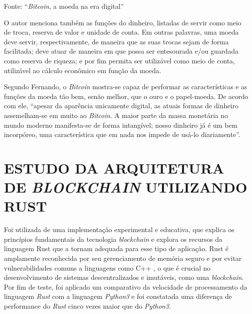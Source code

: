 \documentclass[article,12pt,oneside,a4paper,english,brazil]{unifil}
\begin{document}
\begin{Spacing}{1.5}
\begin{table}[h]
\begin{tabular}{|c|c|c|c|}
	\end{tabular}
    \label{tab:atributos}
\end{table}
\centerline{Fonte: ``\textit{Bitcoin}, a moeda na era digital''\cite{Ulrich2014}}
\FloatBarrier

O autor menciona também as funções do dinheiro, listadas de servir como meio de troca, reserva de valor e unidade de conta. Em outras palavras, uma moeda deve servir, respectivamente, de maneira que as suas trocas sejam de forma facilitada; deve atuar de maneira em que possa ser entesourada e/ou guardada como reserva de riqueza; e por fim permita ser utilizável como meio de conta, utilizável ao cálculo econômico em função da moeda.

Segundo Fernando, o \textit{Bitcoin} mostra-se capaz de performar as características e as funções da moeda tão bem, senão melhor, que o ouro e o papel-moeda. De acordo com ele, ``apesar da aparência unicamente digital, as atuais formas de dinheiro assemelham-se em muito ao \textit{Bitcoin}. A maior parte da massa monetária no mundo moderno manifesta-se de forma intangível; nosso dinheiro já é um bem incorpóreo, uma característica que em nada nos impede de usá-lo diariamente''\cite[p.95]{Ulrich2014}.



% 

\section*{ESTUDO DA ARQUITETURA DE \textit{BLOCKCHAIN} UTILIZANDO RUST}

Foi utilizada de uma implementação experimental e educativa, que explica os princípios fundamentais da tecnologia \textit{blockchain} e explora os recursos da linguagem Rust que a tornam adequada para esse tipo de aplicação. Rust é amplamente reconhecida por seu gerenciamento de memória seguro e por evitar vulnerabilidades comuns a linguagens como C++ \cite{matsakis2014rust}, o que é crucial no desenvolvimento de sistemas descentralizados e imutáveis, como uma \textit{blockchain}. Por fim de teste, foi aplicado um comparativo da velocidade de processamento da linguagem \textit{Rust} com a linguagem \textit{Python3} e foi constatada uma diferença de performance do \textit{Rust} cinco vezes maior que do \textit{Python3}.


\end{Spacing}
\end{document}
